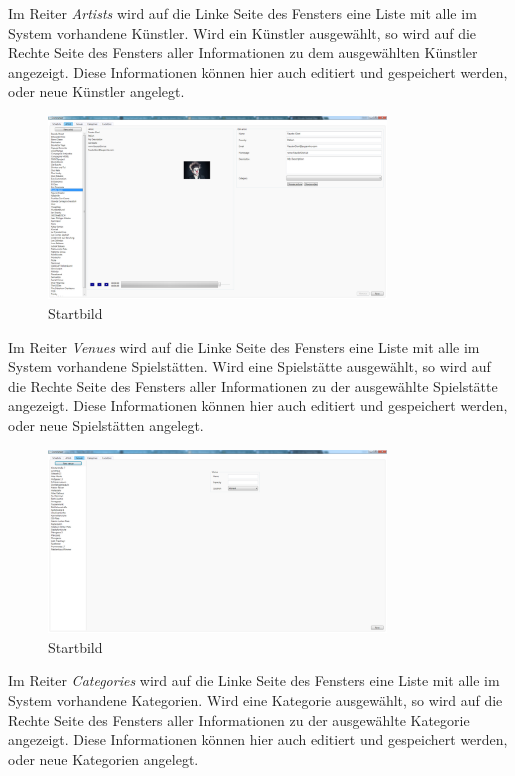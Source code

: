\documentclass[12pt, a4paper]{article}
\begin{document}
Im Reiter \textit{Artists} wird auf die Linke Seite des Fensters eine Liste mit alle im System vorhandene Künstler. Wird ein Künstler ausgewählt, so wird auf die Rechte Seite des Fensters aller Informationen zu dem ausgewählten Künstler angezeigt. Diese Informationen können hier auch editiert und gespeichert werden, oder neue Künstler angelegt.

\begin{figure}[h] 	
	\centering
		\includegraphics[width=0.8\textwidth]{ArtistWindow.png}
	\caption{Startbild}
\end{figure}

Im Reiter \textit{Venues} wird auf die Linke Seite des Fensters eine Liste mit alle im System vorhandene Spielstätten. Wird eine Spielstätte ausgewählt, so wird auf die Rechte Seite des Fensters aller Informationen zu der ausgewählte Spielstätte angezeigt. Diese Informationen können hier auch editiert und gespeichert werden, oder neue Spielstätten angelegt.

\begin{figure}[h] 	
	\centering
		\includegraphics[width=0.8\textwidth]{VenueWindow.png}
	\caption{Startbild}
\end{figure}
\clearpage 
Im Reiter \textit{Categories} wird auf die Linke Seite des Fensters eine Liste mit alle im System vorhandene Kategorien. Wird eine Kategorie ausgewählt, so wird auf die Rechte Seite des Fensters aller Informationen zu der ausgewählte Kategorie angezeigt. Diese Informationen können hier auch editiert und gespeichert werden, oder neue Kategorien angelegt.
\end{document}
